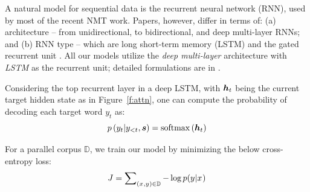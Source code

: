 A natural model for sequential data is the recurrent
neural network (RNN), used by most of the recent NMT work.
Papers, however, differ in terms of: (a) architecture -- from unidirectional, to
bidirectional, and deep multi-layer RNNs; and (b) RNN type -- which are long
short-term memory (LSTM)
\cite{lstm97} and the gated recurrent unit \cite{cho14}. 
All our models utilize the {\it deep multi-layer} architecture with {\it
LSTM} as the recurrent unit; detailed formulations are in \cite{zaremba14}.


Considering the top recurrent layer in a deep LSTM, 
with $\mbox{\boldmath{$h$}}_{t}$ being the current target hidden state as in Figure~\ref{f:attn}, one can compute the probability of decoding each target word $y_t$ as:
\begin{equation}
p\left(y_{t}|y_{<t},\mbox{\boldmath{$s$}}\right) = \operatorname{softmax}\left(\mbox{\boldmath{$h$}}_{t}\right)
\label{e:softmax}
\end{equation}

For a parallel corpus $\mathbb{D}$, we train our model by minimizing the below
cross-entropy loss:
\begin{equation}
J = \sum_{(x_{},y_{}) \in \mathbb{D}} \nolimits -\log p(y_{}|x_{})
\label{e:obj}
\end{equation}

